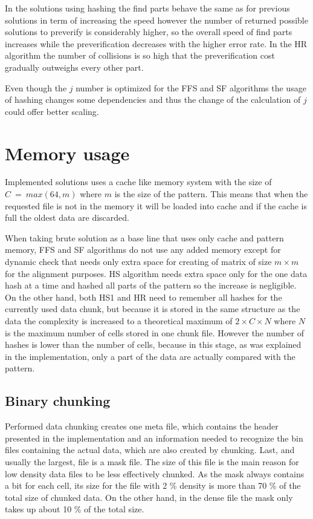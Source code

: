 In the solutions using hashing the find parts behave the same as for previous solutions in term of increasing the speed however the number of returned possible solutions to preverify is considerably higher, so the overall speed of find parts increases while the preverification decreases with the higher error rate. In the HR algorithm the number of collisions is so high that the preverification cost gradually outweighs every other part.

Even though the $j$ number is optimized for the FFS and SF algorithms the usage of hashing changes some dependencies and thus the change of the calculation of $j$ could offer better scaling.

\section{Memory usage}
Implemented solutions uses a cache like memory system with the size of $C~=~max(64, m)$ where $m$ is the size of the pattern. This means that when the requested file is not in the memory it will be loaded into cache and if the cache is full the oldest data are discarded. 

When taking brute solution as a base line that uses only cache and pattern memory, FFS and SF algorithms do not use any added memory except for dynamic check that needs only extra space for creating of matrix of size $m\times m$ for the alignment purposes. HS algorithm needs extra space only for the one data hash at a time and hashed all parts of the pattern so the increase is negligible. On the other hand, both HS1 and HR need to remember all hashes for the currently used data chunk, but because it is stored in the same structure as the data the complexity is increased to a theoretical maximum of $2\times C \times N$ where $N$ is the maximum number of cells stored in one chunk file. However the number of hashes is lower than the number of cells, because in this stage, as was explained in the implementation, only a part of the data are actually compared with the pattern.

\subsection{Binary chunking}
Performed data chunking creates one meta file, which contains the header presented in the implementation and an information needed to recognize the bin files containing the actual data, which are also created by chunking. Last, and usually the largest, file is a mask file. The size of this file is the main reason for low density data files to be less effectively chunked. As the mask always contains a bit for each cell, its size for the file with 2 \% density is more than 70 \% of the total size of chunked data. On the other hand, in the dense file the mask only takes up about 10 \% of the total size. 

